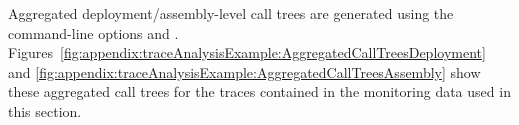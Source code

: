 Aggregated deployment/assembly-level call trees are generated using the command-line options %
\OPT{\OPTplotAggregatedDeploymentCallTree} and \OPT{\OPTplotAggregatedAssemblyCallTree}. %
Figures~\ref{fig:appendix:traceAnalysisExample:AggregatedCallTreesDeployment} and \ref{fig:appendix:traceAnalysisExample:AggregatedCallTreesAssembly} %
show these aggregated call trees for the traces contained in the monitoring data %
used in this section. %

\begin{figure}[h]\centering
{}
\end{figure}
